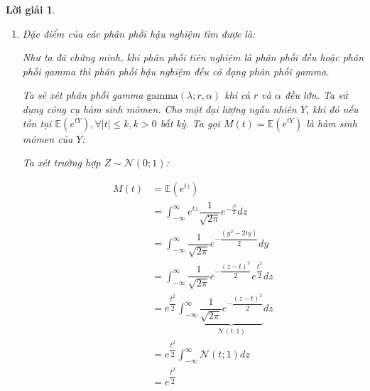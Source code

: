 \documentclass[14pt, a4paper]{article}
\theoremstyle{sltheorem}
\theoremstyle{soltheorem}
\newtheorem*{loigiai}{Lời giải}
\begin{document}
\begin{loigiai}
\begin{enumerate}
        Từ hình \ref{fig:posterior_loop_theory_uniform_deg_less_3} và hình \ref{fig:posterior_loop_theory_gamma_deg_less_3}, ta nhận thấy phân phối hậu nghiệm của tỷ lệ sinh được tính từ lý thuyết và được tính từ thực nghiệm của nhóm phụ nữ có trình độ văn hóa còn lại (DEG $<$ 3) là gần như hoàn toàn trùng khớp.

        \textbf{Nhận xét:} Ta nhận thấy kết quả lý thuyết tìm được và kết quả nhận được từ thực nghiệm (sử dụng vòng lặp cho từng quan sát, hậu nghiệm ở bước trước trở thành tiên nghiệm ở bước sau) cho các phân phối của tỷ lệ sinh là trùng khớp với nhau.

        \item Đặc điểm của các phân phối hậu nghiệm tìm được là:
        
        Như ta đã chứng minh, khi phân phối tiên nghiệm là phân phối đều hoặc phân phối gamma thì phân phối hậu nghiệm đều có dạng phân phối gamma.

        Ta sẽ xét phân phối gamma $\text{gamma}(\lambda; r, \alpha)$ khi cả $r$ và $\alpha$ đều lớn.
        Ta sử dụng công cụ hàm sinh mômen.
        Cho một đại lượng ngẫu nhiên $Y$, khi đó nếu tồn tại $\mathbb{E}(e^{tY}), \forall \lvert t \rvert \leq k, k > 0$ bất kỳ.
        Ta gọi $M(t) = \mathbb{E}(e^{tY})$ là hàm sinh mômen của $Y$:

        Ta xét trường hợp $Z \sim \mathcal{N}(0; 1)$:

        \begin{equation*}
            \begin{aligned}
                M(t) &= \mathbb{E}(e^{tz}) \\
                &=\int_{-\infty}^{\infty} e^{tz} \dfrac{1}{\sqrt{2\pi}} e^{-\frac{z^2}{2}} dz \\
                &=\int_{-\infty}^{\infty} \dfrac{1}{\sqrt{2\pi}} e^{-\dfrac{(y^2-2ty)}{2}} dy \\
                &=\int_{-\infty}^{\infty} \dfrac{1}{\sqrt{2\pi}} e^{-\dfrac{(z-t)^2}{2}}e^{\dfrac{t^2}{2}} dz \\
                &=e^{\dfrac{t^2}{2}}\int_{-\infty}^{\infty} \underbrace{\dfrac{1}{\sqrt{2\pi}} e^{-\dfrac{(z-t)^2}{2}}}_{\mathcal{N}(t;1)} dz \\
                &=e^{\dfrac{t^2}{2}}\int_{-\infty}^{\infty} \mathcal{N}(t;1) dz \\
                &=e^{\dfrac{t^2}{2}}
            \end{aligned}
        \end{equation*}


\end{enumerate}
\end{loigiai}
\end{document}
